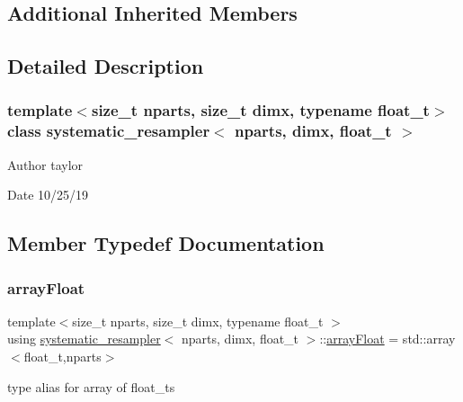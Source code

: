 \subsection*{Additional Inherited Members}


\subsection{Detailed Description}
\subsubsection*{template$<$size\+\_\+t nparts, size\+\_\+t dimx, typename float\+\_\+t$>$\newline
class systematic\+\_\+resampler$<$ nparts, dimx, float\+\_\+t $>$}

\begin{DoxyAuthor}{Author}
taylor 
\end{DoxyAuthor}
\begin{DoxyDate}{Date}
10/25/19 
\end{DoxyDate}


\subsection{Member Typedef Documentation}
\mbox{\label{classsystematic__resampler_ae3f8e7d5687c068b7fc320fe4ee67871}} 
\subsubsection{\texorpdfstring{array\+Float}{arrayFloat}}
{\footnotesize\ttfamily template$<$size\+\_\+t nparts, size\+\_\+t dimx, typename float\+\_\+t $>$ \\
using \hyperlink{classsystematic__resampler}{systematic\+\_\+resampler}$<$ nparts, dimx, float\+\_\+t $>$\+::\hyperlink{classrbase_a6f76bef853e508cb5b6f546d231b06f5}{array\+Float} =  std\+::array$<$float\+\_\+t,nparts$>$}

type alias for array of float\+\_\+ts \mbox{\label{classsystematic__resampler_afbdf5779938dfee726f87d31040284de}} 
